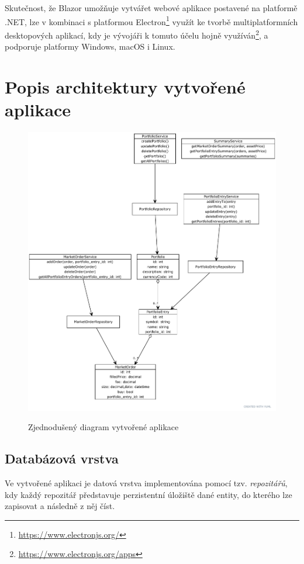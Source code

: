 \documentclass[12pt, a4paper]{article}
\begin{document}
    Skutečnost, že Blazor umožňuje vytvářet webové aplikace postavené na platformě .NET, lze v kombinaci s platformou Electron\footnote{\url{https://www.electronjs.org/}}
    využít ke tvorbě multiplatformních desktopových aplikací, kdy je vývojáři k tomuto účelu hojně využíván\footnote{\url{https://www.electronjs.org/apps}},
    a podporuje platformy Windows, macOS i Linux.

    \section{Popis architektury vytvořené aplikace}

    \begin{figure}[!ht]
        \centering
        {\includegraphics[width=1.15\textwidth]{img/app-diagram.pdf}}
        \caption{Zjednodušený diagram vytvořené aplikace}
        \label{fig:app-diagram}
    \end{figure}

    \subsection{Databázová vrstva}
    Ve vytvořené aplikaci je datová vrstva implementována pomocí tzv. \textit{repozitářů}, kdy každý repozitář představuje perzistentní úložiště dané entity, do kterého lze zapisovat a následně z něj číst.
\end{document}
